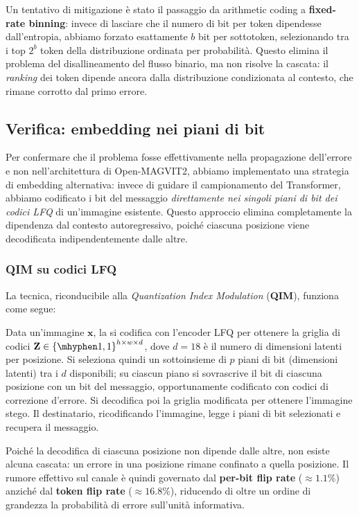 Un tentativo di mitigazione è stato il passaggio da arithmetic coding a \textbf{fixed-rate binning}: invece di lasciare che il numero di bit per token dipendesse dall'entropia, abbiamo forzato esattamente $b$ bit per sottotoken, selezionando tra i top $2^b$ token della distribuzione ordinata per probabilità. Questo elimina il problema del disallineamento del flusso binario, ma non risolve la cascata: il \emph{ranking} dei token dipende ancora dalla distribuzione condizionata al contesto, che rimane corrotto dal primo errore.

\subsection{Verifica: embedding nei piani di bit}

Per confermare che il problema fosse effettivamente nella propagazione dell'errore e non nell'architettura di Open-MAGVIT2, abbiamo implementato una strategia di embedding alternativa: invece di guidare il campionamento del Transformer, abbiamo codificato i bit del messaggio \emph{direttamente nei singoli piani di bit dei codici LFQ} di un'immagine esistente. Questo approccio elimina completamente la dipendenza dal contesto autoregressivo, poiché ciascuna posizione viene decodificata indipendentemente dalle altre.

\subsubsection{QIM su codici LFQ}

La tecnica, riconducibile alla \emph{Quantization Index Modulation} (\textbf{QIM}), funziona come segue:

Data un'immagine $\mathbf{x}$, la si codifica con l'encoder LFQ per ottenere la griglia di codici $\mathbf{Z} \in {\{\mhyphen1, 1\}}^{h \times w \times d}$, dove $d = 18$ è il numero di dimensioni latenti per posizione. Si seleziona quindi un sottoinsieme di $p$ piani di bit (dimensioni latenti) tra i $d$ disponibili; su ciascun piano si sovrascrive il bit di ciascuna posizione con un bit del messaggio, opportunamente codificato con codici di correzione d'errore. Si decodifica poi la griglia modificata per ottenere l'immagine stego. Il destinatario, ricodificando l'immagine, legge i piani di bit selezionati e recupera il messaggio.

Poiché la decodifica di ciascuna posizione non dipende dalle altre, non esiste alcuna cascata: un errore in una posizione rimane confinato a quella posizione. Il rumore effettivo sul canale è quindi governato dal \textbf{per-bit flip rate} ($\approx 1.1\%$) anziché dal \textbf{token flip rate} ($\approx 16.8\%$), riducendo di oltre un ordine di grandezza la probabilità di errore sull'unità informativa.

